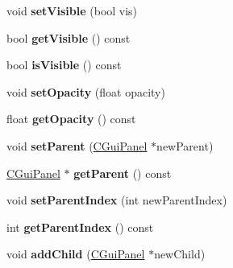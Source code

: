 \begin{DoxyCompactItemize}
\item 
\hypertarget{class_c_gui_panel_a657e5c19cc865a96b177d9d623961410}{
void {\bfseries setVisible} (bool vis)}
\label{class_c_gui_panel_a657e5c19cc865a96b177d9d623961410}

\item 
\hypertarget{class_c_gui_panel_af4f32f02279030741b4d779390e6438d}{
bool {\bfseries getVisible} () const }
\label{class_c_gui_panel_af4f32f02279030741b4d779390e6438d}

\item 
\hypertarget{class_c_gui_panel_a17ee16bdde22cb32a2812e5016ce4080}{
bool {\bfseries isVisible} () const }
\label{class_c_gui_panel_a17ee16bdde22cb32a2812e5016ce4080}

\item 
\hypertarget{class_c_gui_panel_a311cba7bad186311eac24f5626be4028}{
void {\bfseries setOpacity} (float opacity)}
\label{class_c_gui_panel_a311cba7bad186311eac24f5626be4028}

\item 
\hypertarget{class_c_gui_panel_a74c7bb12ba5f712a1e20c82f395feaa0}{
float {\bfseries getOpacity} () const }
\label{class_c_gui_panel_a74c7bb12ba5f712a1e20c82f395feaa0}

\item 
\hypertarget{class_c_gui_panel_a28a4009593eaf413b846785580e61b1c}{
void {\bfseries setParent} (\hyperlink{class_c_gui_panel}{CGuiPanel} $\ast$newParent)}
\label{class_c_gui_panel_a28a4009593eaf413b846785580e61b1c}

\item 
\hypertarget{class_c_gui_panel_a24be118c4d2f1838ecc56546712b5fe0}{
\hyperlink{class_c_gui_panel}{CGuiPanel} $\ast$ {\bfseries getParent} () const }
\label{class_c_gui_panel_a24be118c4d2f1838ecc56546712b5fe0}

\item 
\hypertarget{class_c_gui_panel_afb3547da8e7efd14e35ab45752a3665a}{
void {\bfseries setParentIndex} (int newParentIndex)}
\label{class_c_gui_panel_afb3547da8e7efd14e35ab45752a3665a}

\item 
\hypertarget{class_c_gui_panel_af07106a92beb040c127db814a63a87ad}{
int {\bfseries getParentIndex} () const }
\label{class_c_gui_panel_af07106a92beb040c127db814a63a87ad}

\item 
\hypertarget{class_c_gui_panel_a02c239ffbaca0a9ac53ec19030a9a670}{
void {\bfseries addChild} (\hyperlink{class_c_gui_panel}{CGuiPanel} $\ast$newChild)}
\label{class_c_gui_panel_a02c239ffbaca0a9ac53ec19030a9a670}


\end{DoxyCompactItemize}
